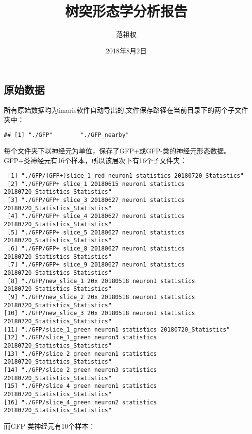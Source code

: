 \documentclass[]{article}
\title{树突形态学分析报告}
\author{范祖权}
\date{2018年8月2日}
\begin{document}
\maketitle

\subsection{原始数据}

所有原始数据均为imaris软件自动导出的,文件保存路径在当前目录下的两个子文件夹中：

\begin{verbatim}
## [1] "./GFP"        "./GFP_nearby"
\end{verbatim}

每个文件夹下以神经元为单位，保存了GFP+或GFP-类的神经元形态数据。GFP+类神经元有16个样本，所以该层次下有16个子文件夹：

\begin{verbatim}
 [1] "./GFP/(GFP+)slice_1_red neuron1 statistics 20180720_Statistics"                  
 [2] "./GFP/GFP+ slice_1 20180615 neuron1 statistics 20180720_Statistics_Statistics"   
 [3] "./GFP/GFP+ slice_3 20180627 neuron1 statistics 20180720_Statistics_Statistics"   
 [4] "./GFP/GFP+ slice_4 20180627 neuron1 statistics 20180720_Statistics_Statistics"   
 [5] "./GFP/GFP+ slice_5 20180627 neuron1 statistics 20180720_Statistics_Statistics"   
 [6] "./GFP/GFP+ slice_8 20180627 neuron1 statistics 20180720_Statistics_Statistics"   
 [7] "./GFP/GFP+ slice_9 20180627 neuron1 statistics 20180720_Statistics_Statistics"   
 [8] "./GFP/new_slice_1 20x 20180518 neuron1 statistics 20180720_Statistics_Statistics"
 [9] "./GFP/new_slice_2 20x 20180518 neuron1 statistics 20180720_Statistics_Statistics"
[10] "./GFP/new_slice_3 20x 20180518 neuron1 statistics 20180720_Statistics_Statistics"
[11] "./GFP/slice_1_green neuron1 statistics 20180720_Statistics"                      
[12] "./GFP/slice_1_green neuron3 statistics 20180720_Statistics_Statistics"           
[13] "./GFP/slice_2_green neuron1 statistics 20180720_Statistics_Statistics"           
[14] "./GFP/slice_2_green neuron3 statistics 20180720_Statistics_Statistics"           
[15] "./GFP/slice_4_green neuron1 statistics 20180720_Statistics_Statistics"           
[16] "./GFP/slice_4_green neuron2 statistics 20180720_Statistics_Statistics"           
\end{verbatim}

而GFP-类神经元有10个样本：
\end{document}
